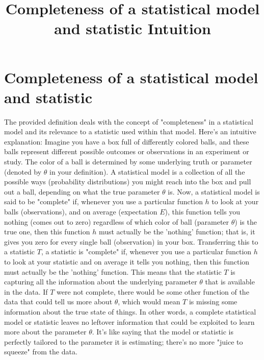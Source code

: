 \documentclass{article}
\title{Completeness of a statistical model and statistic Intuition}
\begin{document}
\maketitle
\section{Completeness of a statistical model and statistic}
The provided definition deals with the concept of "completeness" in a statistical model and its relevance to a statistic used within that model. Here's an intuitive explanation:
\newline
Imagine you have a box full of differently colored balls, and these balls represent different possible outcomes or observations in an experiment or study. The color of a ball is determined by some underlying truth or parameter (denoted by $\theta$ in your definition). A statistical model is a collection of all the possible ways (probability distributions) you might reach into the box and pull out a ball, depending on what the true parameter $\theta$ is.
\newline
Now, a statistical model is said to be "complete" if, whenever you use a particular function \( h \) to look at your balls (observations), and on average (expectation \( E \)), this function tells you nothing (comes out to zero) regardless of which color of ball (parameter $\theta$) is the true one, then this function \( h \) must actually be the 'nothing' function; that is, it gives you zero for every single ball (observation) in your box.
\newline
Transferring this to a statistic \( T \), a statistic is "complete" if, whenever you use a particular function \( h \) to look at your statistic and on average it tells you nothing, then this function must actually be the 'nothing' function. This means that the statistic \( T \) is capturing all the information about the underlying parameter $\theta$ that is available in the data. If \( T \) were not complete, there would be some other function of the data that could tell us more about $\theta$, which would mean \( T \) is missing some information about the true state of things.
\newline
In other words, a complete statistical model or statistic leaves no leftover information that could be exploited to learn more about the parameter $\theta$. It's like saying that the model or statistic is perfectly tailored to the parameter it is estimating; there's no more "juice to squeeze" from the data.
\end{document}

